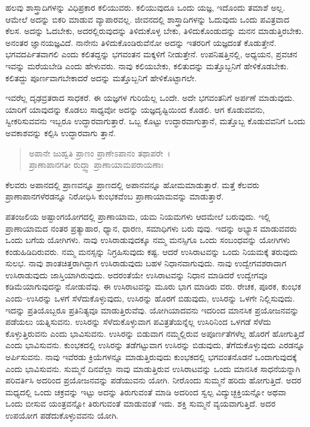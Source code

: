 ಹಲವು ಶಾಸ್ತ್ರಾದಿಗಳನ್ನು ವಿಧಿಪ್ರಕಾರ ಕಲಿಯುವರು. ಕಲಿಯುವುದೂ ಒಂದು ಯಜ್ಞ, ಇದೊಂದು ತಮಾಶೆ ಅಲ್ಲ. ಆಮೇಲೆ ಅದನ್ನು ಬಿಕರಿ ಮಾಡುವ ವ್ಯಾಪಾರವಲ್ಲ. ಜೀವನದಲ್ಲಿ ಶಾಸ್ತ್ರಾದಿಗಳನ್ನು ಓದುವುದು ಒಂದು ಪವಿತ್ರವಾದ ಕೆಲಸ. ಅದನ್ನು ಓದಬೇಕು, ಅದರಲ್ಲಿರುವುದನ್ನು ತಿಳಿದುಕೊಳ್ಳ ಬೇಕು, ತಿಳಿದುಕೊಂಡುದನ್ನು ಮನನ ಮಾಡುತ್ತಿರಬೇಕು. ಅನಂತರ ಜ್ಞಾನಯಜ್ಞವಿದೆ. ನಾನೇನು ತಿಳಿದುಕೊಂಡಿರುವೆನೋ ಅದನ್ನು ಇತರರಿಗೆ ಯಜ್ಞದಂತೆ ಕೊಡುತ್ತೇನೆ. ಭಗವದರ್ಪಿತವಾಗಲಿ ಎಂದು ಕಲಿತದ್ದನ್ನು ಭಗವಂತನ ಮಕ್ಕಳಿಗೆ ನೀಡುತ್ತೇನೆ. ಉಪನಿಷತ್ತಿನಲ್ಲಿ, ಅಧ್ಯಯನ, ಪ್ರವಚನ ಇವನ್ನು ಮರೆಯಬೇಡಿ ಎಂದು ಹೇಳುವರು. ನಾವು ಕಲಿಯಬೇಕು, ಕಲಿತುದನ್ನು ಮತ್ತೊಬ್ಬನಿಗೆ ಹೇಳಿಕೊಡಬೇಕು. ಕಲಿತದ್ದು ಪೂರ್ಣವಾಗಬೇಕಾದರೆ ಅದನ್ನು ಮತ್ತೊಬ್ಬನಿಗೆ ಹೇಳಿಕೊಟ್ಟಾಗಲೇ.

ಇವರೆಲ್ಲ ದೃಢವ್ರತರಾದ ಸಾಧಕರೆ. ಈ ಯಜ್ಞಗಳ ಗುರಿಯೆಲ್ಲ ಒಂದೇ. ಅದೇ ಭಗವಂತನಿಗೆ ಅರ್ಪಣೆ ಮಾಡುವುದು. ಯಾರಿಗೆ ಯಾವುದನ್ನು ಕೊಡಲು ಸಾಧ್ಯವೋ ಅದನ್ನು ಯಜ್ಞದೃಷ್ಟಿಯಿಂದ ಕೊಡಲಿ. ಆಗ ಕೊಡುವವನು, ಸ್ವೀಕರಿಸುವವನು ಇಬ್ಬರೂ ಉದ್ಧಾರವಾಗುತ್ತಾರೆ. ಒಬ್ಬ ಕೊಟ್ಟು ಉದ್ಧಾರವಾಗುತ್ತಾನೆ, ಮತ್ತೊಬ್ಬ ಕೊಡುವವನಿಗೆ ಒಂದು ಅವಕಾಶವನ್ನು ಕಲ್ಪಿಸಿ ಉದ್ಧಾರವಾಗು ತ್ತಾನೆ.

\begin{verse}
ಅಪಾನೇ ಜುಹ್ವತಿ ಪ್ರಾಣಂ ಪ್ರಾಣೇಽಪಾನಂ ತಥಾಪರೇ~।\\ಪ್ರಾಣಾಪಾನಗತೀ ರುದ್ಧ್ವಾ ಪ್ರಾಣಾಯಾಮಪರಾಯಣಾಃ 
\end{verse}

{\small ಕೆಲವರು ಅಪಾನದಲ್ಲಿ ಪ್ರಾಣವನ್ನೂ ಪ್ರಾಣದಲ್ಲಿ ಅಪಾನವನ್ನೂ ಹೋಮಮಾಡುತ್ತಾರೆ. ಮತ್ತೆ ಕೆಲವರು ಪ್ರಾಣಾಪಾನಗಳೆರಡನ್ನೂ ನಿರೋಧಿಸಿ ಕುಂಭಕವೆಂಬ ಪ್ರಾಣಾಯಾಮವನ್ನು ಮಾಡುತ್ತಾರೆ.}

ಪತಂಜಲಿಯ ಅಷ್ಟಾಂಗಯೋಗದಲ್ಲಿ ಪ್ರಾಣಾಯಾಮ, ಯಮ ನಿಯಮಗಳು ಆದಮೇಲೆ ಬರುವುದು. ಇಲ್ಲಿ ಪ್ರಾಣಾಯಾಮದ ನಂತರ ಪ್ರತ್ಯಾಹಾರ, ಧ್ಯಾನ, ಧಾರಣ, ಸಮಾಧಿಗಳು ಬರು ವುವು. ಇದನ್ನು ಅಭ್ಯಾಸ ಮಾಡುವವರು ಒಂದು ಬಗೆಯ ಯೋಗಿಗಳು. ನಾವು ಉಸಿರಾಡುವುದಕ್ಕೂ ನಮ್ಮ ಮನಸ್ಸಿಗೂ ಒಂದು ಸಂಬಂಧವನ್ನು ಯೋಗಿಗಳು ಕಂಡುಹಿಡಿದಿರುವರು. ನಮ್ಮ ಮನಸ್ಸನ್ನು ನಿಗ್ರಹಿಸುವುದು ಕಷ್ಟ. ಆದರೆ ಉಸಿರಾಟವನ್ನು ಒಂದು ನಿಯಮಕ್ಕೆ ತರುವುದು ಸುಲಭ. ನಾವು ಶಾಂತಚಿತ್ತರಾಗಿದ್ದಾಗ ಉಸಿರಾಡುವುದು ಬಹಳ ನಿಧಾನವಾಗುವುದು. ನಾವು ಉದ್ವೇಗವಶರಾದಾಗ ಉಸಿರಾಡುವುದು ಜಾಸ್ತಿಯಾಗಿರುವುದು. ಅದರಂತೆಯೇ ಉಸಿರಾಟವನ್ನು ನಿಧಾನ ಮಾಡಿದರೆ ಉದ್ವೇಗವೂ ಕಡಿಮೆಯಾಗುವುದನ್ನು ನೋಡುವೆವು. ಈ ಉಸಿರಾಟವನ್ನು ಮೂರು ಭಾಗ ಮಾಡಿರು ವರು. ರೇಚಕ, ಪೂರಕ, ಕುಂಭಕ ಎಂದು–ಉಸಿರನ್ನು ಒಳಗೆ ಸೆಳೆದುಕೊಳ್ಳುವುದು, ಉಸಿರನ್ನು ಹೊರಗೆ ಬಿಡುವುದು, ಉಸಿರನ್ನು ಒಳಗೇ ನಿಲ್ಲಿಸುವುದು. ಇದನ್ನು ಪ್ರತಿಯೊಬ್ಬರೂ ಪ್ರತಿನಿತ್ಯವೂ ಮಾಡುತ್ತಿರುವೆವು. ಯೋಗಿಯಾದವನು ಇದರಿಂದ ಮಾನಸಿಕ ಪ್ರಯೋಜನವನ್ನು ಪಡೆಯಲು ಯತ್ನಿಸುವನು. ಉಸಿರನ್ನು ಸೆಳೆದುಕೊಳ್ಳುವಾಗ ಪವಿತ್ರತೆಯನ್ನೆಲ್ಲ ಉಸಿರಿನಿಂದ ಒಳಗಡೆ ಸೆಳೆದು ಕೊಳ್ಳುತ್ತಿರುವನು ಎಂದು ಭಾವಿಸುವನು. ಉಸಿರನ್ನು ಬಿಡುವಾಗ ನಮ್ಮಲ್ಲಿರುವ ಅಪೂರ್ಣತೆಗಳೆಲ್ಲ ಹೊರಗೆ ಹೋಗುತ್ತಿದೆ ಎಂದು ಭಾವಿಸುವನು. ಕುಂಭಕದಲ್ಲಿ ಉಸಿರನ್ನು ತಡೆಗಟ್ಟುವಾಗ ಉಸಿರನ್ನು ಬಿಡುವುದು, ತೆಗೆದುಕೊಳ್ಳುವುದು ಎರಡನ್ನೂ ಅರ್ಪಿಸುವನು. ನಾವು ಇವೆರಡು ಕ್ರಿಯೆಗಳನ್ನೂ ಮಾಡುತ್ತಿರುವುದು ಕುಂಭಕದಲ್ಲಿ ಭಗವಂತನೊಡನೆ ಒಂದಾಗುವುದಕ್ಕೆ ಎಂದು ಭಾವಿಸುವನು. ಸುಮ್ಮನೆ ದಿನವೆಲ್ಲಾ ನಾವು ಮಾಡುತ್ತಿರುವ ಉಸಿರಾಟವನ್ನು ಒಂದು ಮಾನಸಿಕ ಸಾಧನೆಯನ್ನಾಗಿ ಪರಿವರ್ತಿಸಿ ಅದರಿಂದ ಪ್ರಯೋಜನವನ್ನು ಪಡೆಯುವನು ಯೋಗಿ. ನೀರೊಂದು ಸುಮ್ಮನೆ ಹರಿದು ಹೋಗುತ್ತಿದೆ. ಅದರ ಮಧ್ಯದಲ್ಲಿ ಒಂದು ಚಕ್ರವನ್ನು ಇಟ್ಟು ಅದನ್ನು ತಿರುಗುವಂತೆ ಮಾಡಿ ಅದರಿಂದ ಸ್ವಲ್ಪ ವಿದ್ಯುಚ್ಛಕ್ತಿಯನ್ನೋ ಅಥವಾ ಒಂದು ಬೀಸುವ ಯಂತ್ರವನ್ನೋ ತಿರುಗುವಂತೆ ಮಾಡುವಂತೆ ಇದು. ಶಕ್ತಿ ಸುಮ್ಮನೆ ವ್ಯಯವಾಗುತ್ತಿದೆ. ಅದರ ಉಪಯೋಗ ಪಡೆದುಕೊಳ್ಳುವವನು ಯೋಗಿ.

